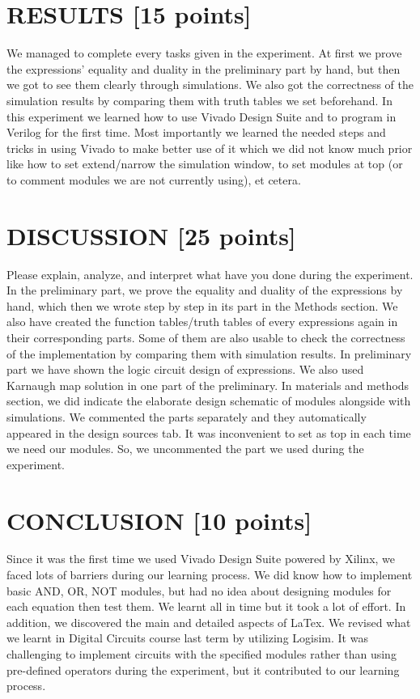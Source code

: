 \documentclass[pdftex,12pt,a4paper]{article}
\begin{document}
\newpage
\section{RESULTS [15 points]}
We managed to complete every tasks given in the experiment. At first we prove the expressions' equality and duality in the preliminary part by hand, but then we got to see them clearly through simulations. We also got the correctness of the simulation results by comparing them with truth tables we set beforehand. In this experiment we learned how to use Vivado Design Suite and to program in Verilog for the first time. Most importantly we learned the needed steps and tricks in using Vivado to make better use of it which we did not know much prior like how to set extend/narrow the simulation window, to set modules at top (or to comment modules we are not currently using), et cetera. 

\section{DISCUSSION [25 points]}
Please explain, analyze, and interpret what have you done during the  experiment. 
In the preliminary part, we prove the equality and duality of the expressions by hand, which then we wrote step by step in its part in the Methods section. We also have created the function tables/truth tables of every expressions again in their corresponding parts. Some of them are also usable to check the correctness of the implementation by comparing them with simulation results. In preliminary part we have shown the logic circuit design of expressions. We also used Karnaugh map solution in one part of the preliminary. In materials and methods section, we did indicate the elaborate design schematic of modules alongside with simulations. We commented the parts separately and they automatically appeared in the design sources tab. It was inconvenient to set as top in each time we need our modules. So, we uncommented the part we used during the experiment. 

\section{CONCLUSION [10 points]}
Since it was the first time we used Vivado Design Suite powered by Xilinx, we faced lots of barriers during our learning process. We did know how to implement basic AND, OR, NOT modules, but had no idea about designing modules for each equation then test them. We learnt all in time but it took a lot of effort. In addition, we discovered the main and detailed aspects of LaTex. We revised what we learnt in Digital Circuits course last term by utilizing Logisim. It was challenging to implement circuits with the specified modules rather than using pre-defined operators during the experiment, but it contributed to our learning process.




\nocite{ref1}
\nocite{overleaf}
\end{document}
